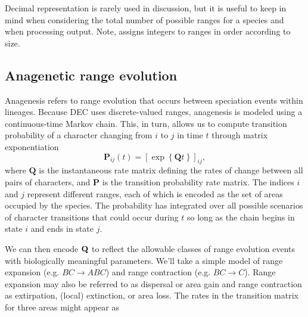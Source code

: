 Decimal representation is rarely used in discussion, but it is useful to keep in mind when considering the total number of possible ranges for a species and when processing output.
Note, \RevBayes assigns integers to ranges in order according to size.

\subsection*{Anagenetic range evolution}


Anagenesis refers to range evolution that occurs between speciation events within lineages.
Because DEC uses discrete-valued ranges, anagenesis is modeled using a continuous-time Markov chain.
This, in turn, allows us to compute transition probability of a character changing from $i$ to $j$ in time $t$ through matrix exponentiation
\[
\mathbf{P}_{ij}(t) = \left[ \exp \left\lbrace \mathbf{Q}t \right\rbrace \right]_{ij},
\]
where $\textbf{Q}$ is the instantaneous rate matrix defining the rates of change between all pairs of characters, and $\textbf{P}$ is the transition probability rate matrix.
The indices $i$ and $j$ represent different ranges, each of which is encoded as the set of areas occupied by the species.
The probability has integrated over all possible scenarios of character transitions that could occur during $t$ so long as the chain begins in state $i$ and ends in state $j$.

We can then encode ${\bf Q}$ to reflect the allowable classes of range evolution events with biologically meaningful parameters.
We'll take a simple model of range expansion (e.g. $BC \rightarrow ABC$) and range contraction (e.g. $BC \rightarrow C$).
Range expansion may also be referred to as dispersal or area gain and range contraction as extirpation, (local) extinction, or area loss.
The rates in the transition matrix for three areas might appear as

